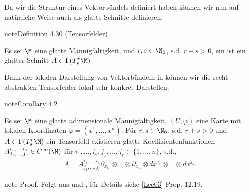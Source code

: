 \documentclass[letterpaper,10pt,english]{jupyterBook}
\begin{document}
\sphinxAtStartPar
Da wir die Struktur eines Vektorbündels definiert haben können wir nun auf natürliche Weise auch  als glatte Schnitte definieren.
\label{manifolds/tangential:definition-45}
\begin{sphinxadmonition}{note}{Definition 4.30 (Tensorfelder)}



\sphinxAtStartPar
Es sei \(\M\) eine glatte Mannigfaltigkeit, und \(r,s\in\N_0\), s.d. \(r+s>0\), ein  ist ein glatter Schnitt \(A\in \Gamma(T^r_s\M)\).
\end{sphinxadmonition}

\sphinxAtStartPar
Dank der lokalen Darstellung von Vektorbündeln in {\hyperref[\detokenize{manifolds/tangential:lem:localsections}]{}} können wir die recht abstrakten Tensorfelder lokal sehr konkret Darstellen.
\label{manifolds/tangential:cor:tensorfieldchart}
\begin{sphinxadmonition}{note}{Corollary 4.2}



\sphinxAtStartPar
Es sei \(\M\) eine glatte \(n\)\sphinxhyphen{}dimensionale Mannigfaltigkeit, \((U,\varphi)\) eine Karte mit lokalen Koordinaten \(\varphi=(x^1,\ldots,x^n)\). Für \(r,s\in\N_0\), s.d. \(r+s>0\) und \(A\in \Gamma(T^r_s\M)\) ein Tensorfeld existieren glatte Koeffizientenfunktionen \(A^{i_1,\ldots, i_s}_{j_1,\ldots,j_r}\in C^\infty(\M)\) für \(i_1,\ldots, i_s, j_1,\ldots, j_r\in \{1,\ldots,n\}\), s.d.,
\begin{equation*}
\begin{split}A = A^{i_1,\ldots,i_s}_{j_1,\ldots,j_r} \partial_{x_{i_1}}\otimes\ldots\otimes \partial_{x_{i_r}}\otimes dx^{j_1}\otimes\ldots\otimes dx^{j_s}.\end{split}
\end{equation*}\end{sphinxadmonition}

\begin{sphinxadmonition}{note}
\sphinxAtStartPar
Proof. Folgt aus {\hyperref[\detokenize{manifolds/tangential:lem:localsections}]{}} und {\hyperref[\detokenize{manifolds/tangential:lem:coordcovec}]{}},  für Details siehe {[}\hyperlink{cite.references:id15}{Lee03}{]} Prop. 12.19.
\end{sphinxadmonition}
\end{document}
